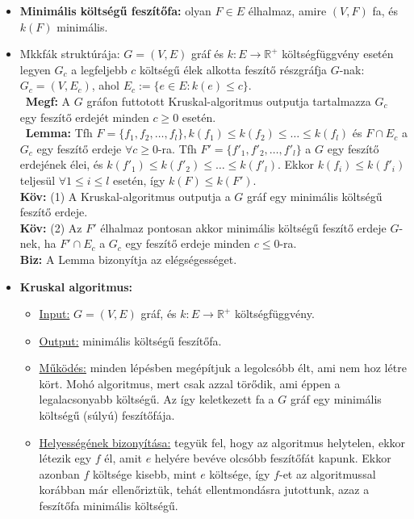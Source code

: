 \documentclass[../../szobeli.tex]{subfiles}
\begin{document}
\begin{itemize}
        \item \textbf{Minimális költségű feszítőfa:} olyan $F\in E$ élhalmaz, amire $(V,F)$ fa, és $k(F)$ minimális.
        \item Mkkfák struktúrája: $G=(V,E)$ gráf és $k:E \rightarrow \mathbb{R}^+$ költségfüggvény esetén legyen $G_c$ a legfeljebb $c$ költségű élek alkotta feszítő részgráfja $G$-nak: $G_c = (V,E_c)$, ahol $E_c := \{e \in E : k(e)\leq c\}$. \\ \textbf{Megf:} A $G$ gráfon futtotott Kruskal-algoritmus outputja tartalmazza $G_c$ egy feszítő erdejét minden $c \geq 0$ esetén. \\ \textbf{Lemma:} Tfh $F=\{f_1,f_2,\dots,f_l\}, k(f_1) \leq k(f_2) \leq \dots \leq k(f_l)$ és $F\cap E_c$ a $G_c$ egy feszítő erdeje $\forall c \geq 0$-ra. Tfh $F' = \{f'_1, f'_2,\dots,f'_l\}$ a $G$ egy feszítő erdejének élei, és $k(f'_1) \leq k(f'_2) \leq \dots \leq k(f'_l)$. Ekkor $k(f_i) \leq k(f'_i)$ teljesül $\forall 1 \leq i \leq l$ esetén, így $k(F) \leq k(F')$. \\ \textbf{Köv:} (1) A Kruskal-algoritmus outputja a $G$ gráf egy minimális költségű feszítő erdeje. \\ \textbf{Köv:} (2) Az $F'$ élhalmaz pontosan akkor minimális költségű feszítő erdeje $G$-nek, ha $F' \cap E_c$ a $G_c$ egy feszítő erdeje minden $c \leq 0$-ra. \\ \textbf{Biz:} A Lemma bizonyítja az elégségességet.
        \item \textbf{Kruskal algoritmus:} \begin{itemize}
            \item \underline{Input:} $G=(V,E)$ gráf, és $k:E\rightarrow \mathbb{R}^+$ költségfüggvény.
            \item \underline{Output:} minimális költségű feszítőfa.
            \item \underline{Működés:} minden lépésben megépítjuk a legolcsóbb élt, ami nem hoz létre kört. Mohó algoritmus, mert csak azzal törődik, ami éppen a legalacsonyabb költségű. Az így keletkezett fa a $G$ gráf egy minimális költségű (súlyú) feszítőfája.
            \item \underline{Helyességének bizonyítása:} tegyük fel, hogy az algoritmus helytelen, ekkor létezik egy $f$ él, amit $e$ helyére bevéve olcsóbb feszítőfát kapunk. Ekkor azonban $f$ költsége kisebb, mint $e$ költsége, így $f$-et az algoritmussal korábban már ellenőriztük, tehát ellentmondásra jutottunk, azaz a feszítőfa minimális költségű.
        \end{itemize}

\end{itemize}
\end{document}

